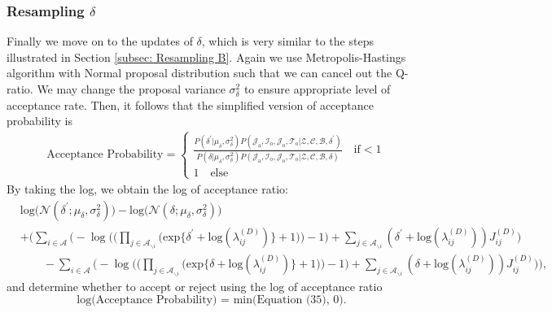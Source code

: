 \documentclass[a4paper]{article}
\begin{document}
   \subsubsection{Resampling $\delta$ }  \label{subsec: Resampling delta}
   Finally we move on to the updates of $\delta$, which is very similar to the steps illustrated in Section \ref{subsec: Resampling B}. Again we use Metropolis-Hastings algorithm with Normal proposal distribution such that we can cancel out the Q-ratio. We may change the proposal variance $\sigma^2_\delta$ to ensure appropriate level of acceptance rate. Then, it follows that the simplified version of acceptance probability is 
   \begin{equation} 
   \begin{split}
   & \mbox{Acceptance Probability}=
   \begin{cases}  \frac{P(\delta^\prime|\mu_\delta, \sigma^2_\delta) P(\mathcal{J}_{\mbox{a}}, \mathcal{I}_{\mbox{o}}, \mathcal{J}_{\mbox{o}}, \mathcal{T}_{\mbox{o}} |\mathcal{Z}, \mathcal{C}, \mathcal{B}, \delta^\prime)}{P(\delta|\mu_\delta, \sigma^2_\delta) P(\mathcal{J}_{\mbox{a}}, \mathcal{I}_{\mbox{o}}, \mathcal{J}_{\mbox{o}}, \mathcal{T}_{\mbox{o}} |\mathcal{Z}, \mathcal{C}, \mathcal{B}, \delta)}\quad\text{if}  <1\\
   1 \quad \text{else}
   \end{cases}
   \end{split}
   \end{equation}
   By taking the log, we obtain the log of acceptance ratio:
   \begin{equation}
   \begin{aligned} 
   &\mbox{log}\Big(\mathcal{N}(\delta^\prime;\mu_\delta, \sigma^2_\delta)\Big)-\mbox{log}\Big(\mathcal{N}(\delta; \mu_\delta, \sigma^2_\delta)\Big)\\&+ \Bigg(\sum_{i\in \mathcal{A}}\Big(-\log\Big(\Big(\prod_{j \in \mathcal{A}_{\backslash i}} \Big(\mbox{exp}\{\delta^\prime+\mbox{log}(\lambda_{ij}^{(D)})\} + 1\Big)\Big)-1\Big) + \sum_{j \in \mathcal{A}_{\backslash i}} (\delta^\prime+\mbox{log}(\lambda_{ij}^{(D)}))J_{ij}^{(D)}\Big)
   \\&\quad\quad -\sum_{i\in \mathcal{A}}\Big(-\log\Big(\Big(\prod_{j \in \mathcal{A}_{\backslash i}} \Big(\mbox{exp}\{\delta+\mbox{log}(\lambda_{ij}^{(D)})\} + 1\Big)\Big)-1\Big) + \sum_{j \in \mathcal{A}_{\backslash i}} (\delta+\mbox{log}(\lambda_{ij}^{(D)}))J_{ij}^{(D)}\Big)\Bigg),
   \end{aligned}
   \end{equation}
   and determine whether to accept or reject using the log of acceptance ratio
   \begin{equation}
   \mbox{log(Acceptance Probability) = min(Equation (35), 0)}.
   \end{equation}
 \newpage
\end{document}

